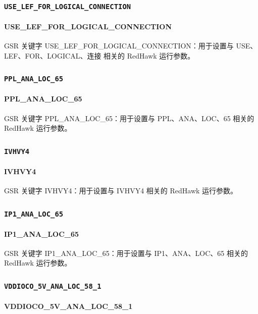 \subsubsection{\texttt{USE_LEF_FOR_LOGICAL_CONNECTION}}
\paragraph*{USE_LEF_FOR_LOGICAL_CONNECTION}

GSR 关键字 USE_LEF_FOR_LOGICAL_CONNECTION：用于设置与 USE、LEF、FOR、LOGICAL、连接 相关的 RedHawk 运行参数。

\subsubsection{\texttt{PPL_ANA_LOC_65}}
\paragraph*{PPL_ANA_LOC_65}

GSR 关键字 PPL_ANA_LOC_65：用于设置与 PPL、ANA、LOC、65 相关的 RedHawk 运行参数。

\subsubsection{\texttt{IVHVY4}}
\paragraph*{IVHVY4}

GSR 关键字 IVHVY4：用于设置与 IVHVY4 相关的 RedHawk 运行参数。

\subsubsection{\texttt{IP1_ANA_LOC_65}}
\paragraph*{IP1_ANA_LOC_65}

GSR 关键字 IP1_ANA_LOC_65：用于设置与 IP1、ANA、LOC、65 相关的 RedHawk 运行参数。

\subsubsection{\texttt{VDDIOCO_5V_ANA_LOC_58_1}}
\paragraph*{VDDIOCO_5V_ANA_LOC_58_1}

